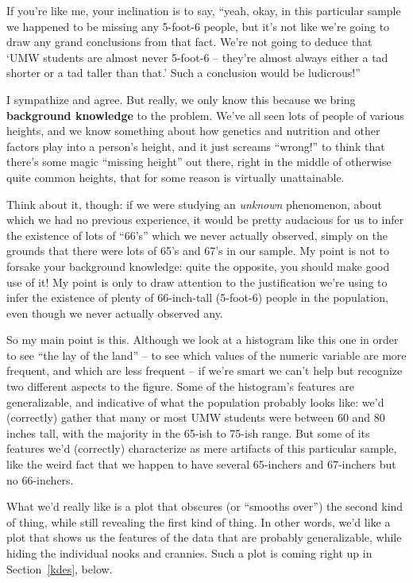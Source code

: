 If you're like me, your inclination is to say, ``yeah, okay, in this particular
sample we happened to be missing any 5-foot-6 people, but it's not like we're
going to draw any grand conclusions from that fact. We're not going to deduce
that `UMW students are almost never 5-foot-6 -- they're almost always either a
tad shorter or a tad taller than that.' Such a conclusion would be ludicrous!''


I sympathize and agree. But really, we only know this because we bring
\textbf{background knowledge} to the problem. We've all seen lots of people of
various heights, and we know something about how genetics and nutrition and
other factors play into a person's height, and it just screams ``wrong!'' to
think that there's some magic ``missing height'' out there, right in the middle
of otherwise quite common heights, that for some reason is virtually
unattainable.

Think about it, though: if we were studying an \textit{unknown} phenomenon,
about which we had no previous experience, it would be pretty audacious for us
to infer the existence of lots of ``66's'' which we never actually observed,
simply on the grounds that there were lots of 65's and 67's in our sample. My
point is not to forsake your background knowledge: quite the opposite, you
should make good use of it! My point is only to draw attention to the
justification we're using to infer the existence of plenty of 66-inch-tall
(5-foot-6) people in the population, even though we never actually observed
any.

So my main point is this. Although we look at a histogram like this one in
order to see ``the lay of the land'' -- to see which values of the numeric
variable are more frequent, and which are less frequent -- if we're smart we
can't help but recognize two different aspects to the figure. Some of the
histogram's features are generalizable, and indicative of what the population
probably looks like: we'd (correctly) gather that many or most UMW students
were between 60 and 80 inches tall, with the majority in the 65-ish to 75-ish
range. But some of its features we'd (correctly) characterize as mere artifacts
of this particular sample, like the weird fact that we happen to have several
65-inchers and 67-inchers but no 66-inchers.

What we'd really like is a plot that obscures (or ``smooths over'') the second
kind of thing, while still revealing the first kind of thing. In other words,
we'd like a plot that shows us the features of the data that are probably
generalizable, while hiding the individual nooks and crannies. Such a plot is
coming right up in Section~\ref{kdes}, below.

